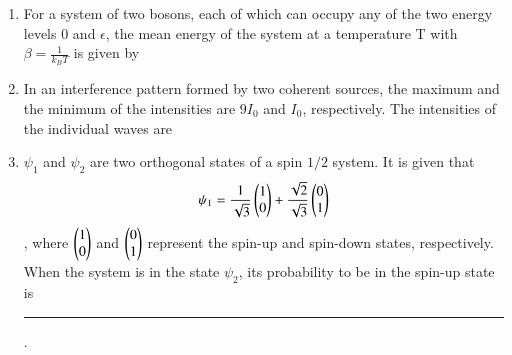 \documentclass[journal,12pt,onecolumn]{IEEEtran}
\theoremstyle{remark}
\begin{document}
\begin{enumerate}
\item For a system of two bosons, each of which can occupy any of the two energy levels 0 and $\epsilon$, the mean energy of the system at a temperature T with $\beta = \frac{1}{k_BT}$ is given by
\hfill{} \begin{enumerate}  \end{enumerate}

\item In an interference pattern formed by two coherent sources, the maximum and the minimum of the intensities are $9I_0$ and $I_0$, respectively. The intensities of the individual waves are
\hfill{} \begin{enumerate}  \end{enumerate}

\item $\psi_1$ and $\psi_2$ are two orthogonal states of a spin $1/2$ system. It is given that $$\psi_1 = \frac{1}{\sqrt{3}} \begin{pmatrix} 1 \\ 0 \end{pmatrix} + \frac{\sqrt{2}}{\sqrt{3}} \begin{pmatrix} 0 \\ 1 \end{pmatrix}$$, where $\begin{pmatrix}1 \\ 0\end{pmatrix}$ and $\begin{pmatrix}0 \\ 1\end{pmatrix}$ represent the spin-up and spin-down states, respectively. When the system is in the state $\psi_2$, its probability to be in the spin-up state is \rule{3cm}{0.4pt}.\hfill{}


\end{enumerate}
\end{document}
